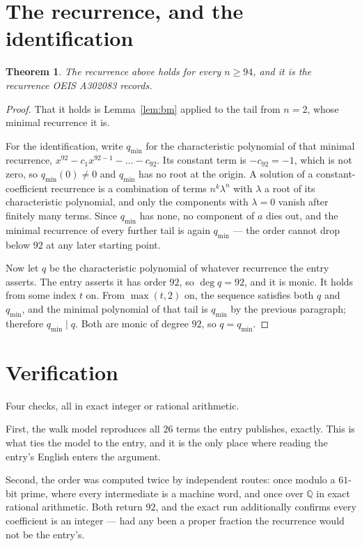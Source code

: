 \documentclass[11pt,a4paper]{article}
\theoremstyle{plain}
\newtheorem{theorem}{Theorem}
\theoremstyle{definition}
\begin{document}
\section{The recurrence, and the identification}

\begin{theorem}
The recurrence above holds for every $n\ge94$, and it is the recurrence OEIS A302083 records.
\end{theorem}

\begin{proof}
That it holds is Lemma~\ref{lem:bm} applied to the tail from $n=2$, whose minimal
recurrence it is.

For the identification, write $q_{\min}$ for the characteristic polynomial of that minimal
recurrence, $x^{92}-c_1x^{92-1}-\dots-c_{92}$. Its constant term is
$-c_{92}=-1$, which is not zero, so $q_{\min}(0)\neq0$ and $q_{\min}$ has no
root at the origin. A solution of a constant-coefficient recurrence is a combination of terms
$n^{k}\lambda^{n}$ with $\lambda$ a root of its characteristic polynomial, and only the
components with $\lambda=0$ vanish after finitely many terms. Since $q_{\min}$ has none, no
component of $a$ dies out, and the minimal recurrence of every further tail is again
$q_{\min}$ --- the order cannot drop below $92$ at any later starting point.

Now let $q$ be the characteristic polynomial of whatever recurrence the entry asserts. The
entry asserts it has order $92$, so $\deg q=92$, and it is monic. It holds from some
index $t$ on. From $\max(t,2)$ on, the sequence satisfies both $q$ and $q_{\min}$, and
the minimal polynomial of that tail is $q_{\min}$ by the previous paragraph; therefore
$q_{\min}\mid q$. Both are monic of degree $92$, so $q=q_{\min}$.
\end{proof}

\section{Verification}

Four checks, all in exact integer or rational arithmetic.

First, the walk model reproduces all $26$ terms the entry publishes, exactly. This is
what ties the model to the entry, and it is the only place where reading the entry's English
enters the argument.

Second, the order was computed twice by independent routes: once modulo a $61$-bit prime, where
every intermediate is a machine word, and once over $\mathbb{Q}$ in exact rational arithmetic.
Both return $92$, and the exact run additionally confirms every coefficient is an integer
--- had any been a proper fraction the recurrence would not be the entry's.
\end{document}
